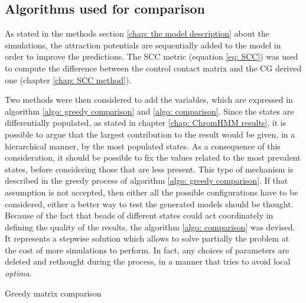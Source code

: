\subsection{Algorithms used for comparison} \label{methods: confront matrices}

As stated in the methods section \ref{chap: the model description} about the simulations, the attraction potentials are sequentially added to the model in order to improve the predictions. The SCC metric (equation \ref{eq: SCC}) was used to compute the difference between the control contact matrix and the CG derived one (chapter \ref{chap: SCC method}).

Two methods were then considered to add the variables, which are expressed in algorithm \ref{algo: greedy comparison} and \ref{algo: comparison}. Since the states are differentially populated, as stated in chapter \ref{chap: ChromHMM results}, it is possible to argue that the largest contribution to the result would be given, in a hierarchical manner, by the most populated states. As a consequence of this consideration, it should be possible to fix the values related to the most prevalent states, before considering those that are less present. This type of mechanism is described in the greedy process of algorithm \ref{algo: greedy comparison}. If that assumption is not accepted, then either all the possible configurations have to be considered, either a better way to test the generated models should be thought.\\

Because of the fact that beads of different states could act coordinately in defining the quality of the results, the algorithm \ref{algo: comparison} was devised. It represents a stepwise solution which allows to solve partially the problem at the cost of more simulations to perform. In fact, any choices of parameters are deleted and rethought during the process, in a manner that tries to avoid local \textit{optima}.\\

\begin{algorithm}[H]
    \caption{Greedy matrix comparison}\label{algo: greedy comparison}
    \;
\end{algorithm}

